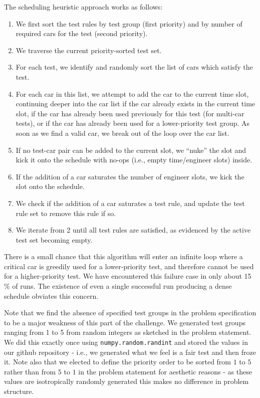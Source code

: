 \documentclass[aps,pra,twocolumn,superscriptaddress,groupedaddress]{revtex4}  %
\begin{document}
The scheduling heuristic approach works as follows:
\begin{enumerate}
\item We first sort the test rules by test group (first priority) and by
number of required cars for the test (second priority).
\item We traverse the current priority-sorted test set.
\item For each test, we identify and randomly sort the list of cars which
satisfy the test.
\item For each car in this list, we attempt to add the car to the current time
slot, continuing deeper into the car list if the car already exists in the
current time slot, if the car has already been used previously for this test
(for multi-car tests), or if the car has already been used for a lower-priority
test group. As soon as we find a valid car, we break out of the loop over the
car list.
\item If no test-car pair can be added to the current slot, we ``nuke'' the slot
and kick it onto the schedule with no-ops (i.e., empty time/engineer slots) inside. 
\item If the addition of a car saturates the number of engineer slots, we kick
the slot onto the schedule.
\item We check if the addition of a car saturates a test rule, and update the
test rule set to remove this rule if so.
\item We iterate from 2 until all test rules are satisfied, as evidenced by the
active test set becoming empty.
\end{enumerate}

There is a small chance that this algorithm will enter an infinite loop where a
critical car is greedily used for a lower-priority test, and therefore cannot be
used for a higher-priority test. We have encountered this failure case in only
about 15$\%$ of runs. The existence of even a single successful run producing a
dense schedule obviates this concern. 

Note that we find the absence of specified test groups in the problem
specification to be a major weakness of this part of the challenge. We generated
test groups ranging from 1 to 5 from random integers as sketched in the problem
statement. We did this exactly once using \texttt{numpy.random.randint} and
stored the values in our github repository - i.e., we generated what we feel is
a fair test and then froze it. Note also that we elected to define the priority
order to be sorted from $1$ to $5$ rather than from $5$ to $1$ in the problem
statement for aesthetic reasons - as these values are isotropically randomly
generated this makes no difference in problem structure.
\end{document}

